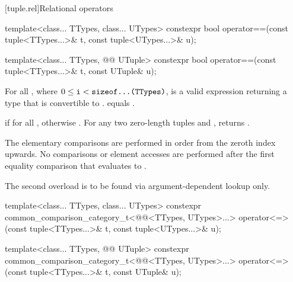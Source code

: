 \documentclass{wg21}
\begin{document}
[tuple.rel]{Relational operators}

%
\begin{itemdecl}
template<class... TTypes, class... UTypes>
constexpr bool operator==(const tuple<TTypes...>& t, const tuple<UTypes...>& u);
\end{itemdecl}
\begin{addedblock}
\begin{itemdecl}
template<class... TTypes, @@ UTuple>
constexpr bool operator==(const tuple<TTypes...>& t, const UTuple& u);
\end{itemdecl}
\end{addedblock}

\begin{itemdescr}
    \pnum
    \mandates
    For all ,
    where $0 \leq \texttt{i} < \texttt{sizeof...(TTypes)}$,
     is a valid expression
    returning a type that is convertible to .
     equals
    .

    \pnum
    \returns
     if  for all
    , otherwise .
    For any two zero-length tuples  and ,  returns .

    \pnum
    \remarks
    The elementary comparisons are performed in order from the
    zeroth index upwards.  No comparisons or element accesses are
    performed after the first equality comparison that evaluates to
    .

    \begin{addedblock}
    \remarks The second overload is to be found via argument-dependent lookup only.
    \end{addedblock}

\end{itemdescr}

%
\begin{itemdecl}
template<class... TTypes, class... UTypes>
constexpr common_comparison_category_t<@@<TTypes, UTypes>...>
operator<=>(const tuple<TTypes...>& t, const tuple<UTypes...>& u);
\end{itemdecl}
\begin{addedblock}
\begin{itemdecl}
template<class... TTypes, @@ UTuple>
constexpr common_comparison_category_t<@@<TTypes, UTypes>...>
operator<=>(const tuple<TTypes...>& t, const UTuple& u);
\end{itemdecl}
\end{addedblock}
\end{document}

